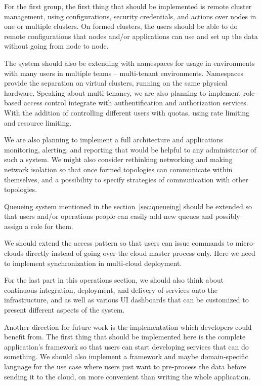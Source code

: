 \noindent
For the first group, the first thing that should be implemented is remote cluster management, using configurations, security credentials, and actions over nodes in one or multiple clusters. On formed clusters, the users should be able to do remote configurations that nodes and/or applications can use and set up the data without going from node to node.

The system should also be extending with namespaces for usage in environments with many users in multiple teams -- multi-tenant environments. Namespaces provide the separation on virtual clusters, running on the same physical hardware. Speaking about multi-tenancy, we are also planning to implement role-based access control integrate with authentification and authorization services. With the addition of controlling different users with quotas, using rate limiting and resource limiting.

We are also planning to implement a full architecture and applications monitoring, alerting, and reporting that would be helpful to any administrator of such a system. We might also consider rethinking networking and making network isolation so that once formed topologies can communicate within themselves, and a possibility to specify 
strategies of communication with other topologies.

Queueing system mentioned in the section~\ref{sec:queueing} should be extended so that users and/or operations people can easily add new queues and possibly assign a role for them.

We should extend the access pattern so that users can issue commands to micro-clouds directly instead of going over the cloud master process only. Here we need to implement synchronization in multi-cloud deployment.

For the last part in this operations section, we should also think about continuous integration, deployment, and delivery of services onto the infrastructure, and as well as various UI dashboards that can be customized to present different aspects of the system.

Another direction for future work is the implementation which developers could benefit from. The first thing that should be implemented here is the complete application's framework so that users can start developing services that can do something. We should also implement a framework and maybe domain-specific language for the use case where users just want to pre-process the data before sending it to the cloud, on more convenient than writing the whole application.

